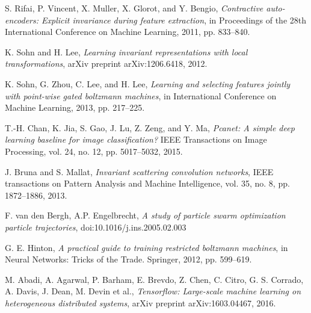 \documentclass[conference]{IEEEtran}
\begin{document}
\begin{thebibliography}{}
S. Rifai, P. Vincent, X. Muller, X. Glorot, and Y. Bengio, \emph{Contractive auto-encoders: Explicit invariance during feature extraction}, in Proceedings of the 28th International Conference on Machine Learning, 2011, pp. 833–840. 

K. Sohn and H. Lee, \emph{Learning invariant representations with local transformations}, arXiv preprint arXiv:1206.6418, 2012. 

K. Sohn, G. Zhou, C. Lee, and H. Lee, \emph{Learning and selecting features jointly with point-wise gated boltzmann machines}, in International Conference on Machine Learning, 2013, pp. 217–225. 

T.-H. Chan, K. Jia, S. Gao, J. Lu, Z. Zeng, and Y. Ma, \emph{Pcanet: A simple deep learning baseline for image classiﬁcation?} IEEE Transactions on Image Processing, vol. 24, no. 12, pp. 5017–5032, 2015. 

J. Bruna and S. Mallat, \emph{Invariant scattering convolution networks}, IEEE transactions on Pattern Analysis and Machine Intelligence, vol. 35, no. 8, pp. 1872–1886, 2013. 

F. van den Bergh, A.P. Engelbrecht, \emph{A study of particle swarm optimization particle trajectories}, doi:10.1016/j.ins.2005.02.003

G. E. Hinton, \emph{A practical guide to training restricted boltzmann machines}, in Neural Networks: Tricks of the Trade. Springer, 2012, pp. 599–619.

M. Abadi, A. Agarwal, P. Barham, E. Brevdo, Z. Chen, C. Citro, G. S. Corrado, A. Davis, J. Dean, M. Devin et al., \emph{Tensorﬂow: Large-scale machine learning on heterogeneous distributed systems}, arXiv preprint arXiv:1603.04467, 2016. 

\end{thebibliography}




\end{document}
